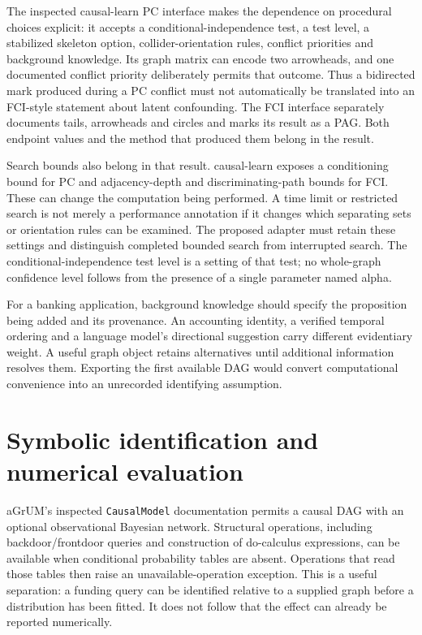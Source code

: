 The inspected causal-learn PC interface makes the dependence on procedural
choices explicit: it accepts a conditional-independence test, a test level,
a stabilized skeleton option, collider-orientation rules, conflict priorities
and background knowledge. Its graph matrix can encode two arrowheads, and
one documented conflict priority deliberately permits that outcome. Thus a
bidirected mark produced during a PC conflict must not automatically be
translated into an FCI-style statement about latent confounding. The FCI
interface separately documents tails, arrowheads and circles and marks its
result as a PAG. Both endpoint values and the method that produced them
belong in the result.\cite{causallearn}

Search bounds also belong in that result. causal-learn exposes a conditioning
bound for PC and adjacency-depth and discriminating-path bounds for FCI. These
can change the computation being performed. A time limit or restricted search
is not merely a performance annotation if it changes which separating sets or
orientation rules can be examined. The proposed adapter must retain these
settings and distinguish completed bounded search from interrupted search.
The conditional-independence test level is a setting of that test; no whole-graph
confidence level follows from the presence of a single parameter named alpha.

For a banking application, background knowledge should specify the proposition
being added and its provenance. An accounting identity, a verified temporal
ordering and a language model's directional suggestion carry different
evidentiary weight. A useful graph object retains alternatives until additional
information resolves them. Exporting the first available DAG would convert
computational convenience into an unrecorded identifying assumption.

\section{Symbolic identification and numerical evaluation}

aGrUM's inspected \texttt{CausalModel} documentation permits a causal DAG with
an optional observational Bayesian network. Structural operations, including
backdoor/frontdoor queries and construction of do-calculus expressions, can
be available when conditional probability tables are absent. Operations that
read those tables then raise an unavailable-operation exception. This is a
useful separation: a funding query can be identified relative to a supplied
graph before a distribution has been fitted. It does not follow that the
effect can already be reported numerically.\cite{agrum}

